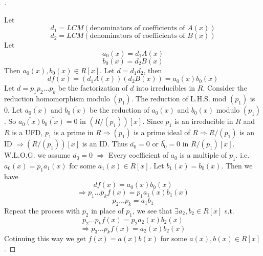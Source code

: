\documentclass{article}
\theoremstyle{definition}
\newenvironment{proofs}[1][\proofname]{%
  \begin{proof}[#1]$ $\par\nobreak\ignorespaces
}{%
  \end{proof}
}
\begin{document}
\begin{proofs}
  Let 
  $$d_1 = LCM(\text{denominators of coefficients of } A(x))$$
  $$d_2 = LCM(\text{denominators of coefficients of } B(x))$$
  Let 
  $$a_0(x) = d_1 A(x)$$
  $$b_0(x) = d_2 B(x)$$
  Then $a_0(x), b_0(x) \in R[x]$. Let $d = d_1 d_2$, then 
  $$d f(x) = (d_1 A(x)) (d_2 B(x))  = a_0(x) b_0(x)$$
  Let $d = p_1 p_2 \hdots p_k$ be the factorization of $d$ into irreducibles in $R$. Consider the reduction homomorphism modulo $(p_1)$. The reduction of L.H.S. mod $(p_1)$ is 0. Let $\overline{a_0(x)}$ and $\overline{b_0(x)}$ be the reduction of $a_0(x)$ and $b_0(x)$ modulo $(p_1)$. So $\overline{a_0(x)} \overline{b_0(x)} = 0$ in $(R/(p_1))[x]$. Since $p_1$ is an irreducible in $R$ and $R$ is a UFD, $p_1$ is a prime in $R \Rightarrow (p_1)$ is a prime ideal of $R \Rightarrow R/(p_1)$ is an ID $\Rightarrow (R/(p_1))[x]$ is an ID. Thus $\overline{a_0} = 0$ or $\overline{b_0} = 0$ in $R/(p_1)[x]$. W.L.O.G. we assume $\overline{a_0} = 0$ $\Rightarrow$ Every coefficient of $a_0$ is a multiple of $p_1$. i.e. $a_0(x) = p_1 a_1(x)$ for some $a_1(x) \in R[x]$. Let $b_1(x) = b_0(x)$. Then we have 
  $$d f(x) = a_0(x) b_0(x)$$
  $$\Rightarrow p_1 \hdots p_k f(x) = p_1 a_1(x) b_1(x)$$
  $$p_2 \hdots p_k = a_1 b_1$$
  Repeat the process with $p_2$ in place of $p_1$, we see that $\exists a_2, b_2 \in R[x]$ s.t. 
  $$p_2 \hdots p_k f(x) = p_2 a_2(x) b_2(x)$$
  $$\Rightarrow p_3 \hdots p_k f(x) = a_2(x) b_2(x)$$ 
  Cotinuing this way we get $f(x) = a(x) b(x)$ for some $a(x), b(x) \in R[x]$. 
\end{proofs}
\end{document}
